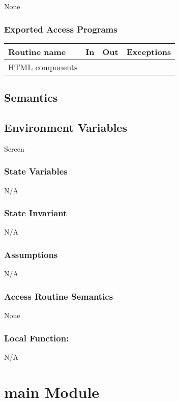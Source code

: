 \documentclass[12pt]{article}
\begin{document}
None

\subsubsection* {Exported Access Programs}
\begin{tabular}{| l | l | l | p{6cm} |}
\hline
\textbf{Routine name} & \textbf{In} & \textbf{Out} & \textbf{Exceptions}\\
\hline
HTML components & ~ & ~ &  \\
\hline
\end{tabular}


\subsection* {Semantics}

\subsection*{Environment Variables}

Screen

\subsubsection* {State Variables}
N/A

\subsubsection* {State Invariant}

N/A

\subsubsection* {Assumptions}

N/A

\subsubsection* {Access Routine Semantics}

None

\subsubsection*{Local Function:}

N/A


\newpage

\section {main Module}
\end{document}
